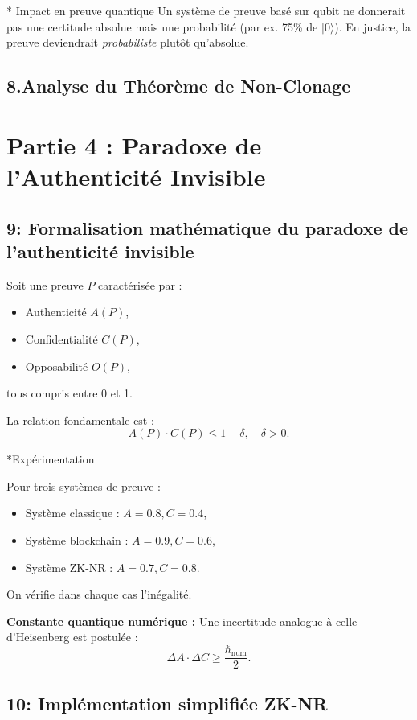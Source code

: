\documentclass[12pt,a4paper]{article}
\begin{document}
	 * Impact en preuve quantique
	 Un système de preuve basé sur qubit ne donnerait pas une certitude absolue mais une probabilité (par ex. 75\% de \(|0\rangle\)). En justice, la preuve deviendrait \emph{probabiliste} plutôt qu'absolue.
	 
	 
	 \subsection*{8.Analyse du Théorème de Non-Clonage }
	
	 \section*{Partie 4 : Paradoxe de l’Authenticité Invisible}
	 
	 \subsection*{ 9: Formalisation mathématique du paradoxe de l'authenticité invisible}
	 
	 Soit une preuve \(P\) caractérisée par :
	 \begin{itemize}
	 	\item Authenticité \(A(P)\),
	 	\item Confidentialité \(C(P)\),
	 	\item Opposabilité \(O(P)\),
	 \end{itemize}
	 tous compris entre 0 et 1.  
	 
	 La relation fondamentale est :
	 \[
	 A(P)\cdot C(P) \leq 1-\delta, \quad \delta > 0.
	 \]
	 
	 *Expérimentation
	 
	 Pour trois systèmes de preuve :
	 \begin{itemize}
	 	\item Système classique : \(A=0.8, C=0.4\),
	 	\item Système blockchain : \(A=0.9, C=0.6\),
	 	\item Système ZK-NR : \(A=0.7, C=0.8\).
	 \end{itemize}
	 
	 On vérifie dans chaque cas l'inégalité.  
	 
	 \textbf{Constante quantique numérique :}
	 Une incertitude analogue à celle d'Heisenberg est postulée :
	 \[
	 \Delta A \cdot \Delta C \geq \frac{\hbar_{\text{num}}}{2}.
	 \]
	 
	 \subsection*{10: Implémentation simplifiée ZK-NR}
	 
\end{document}
